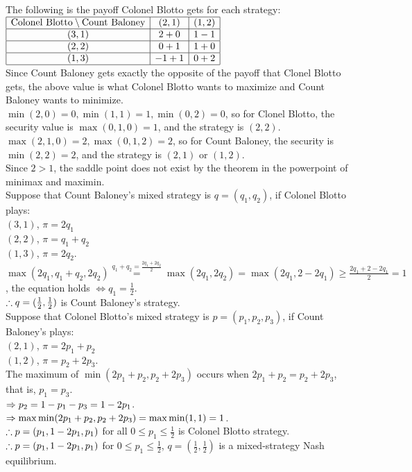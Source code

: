 \begin{pr}
The following is the payoff Colonel Blotto gets for each strategy:\\
$\begin{array}{|c|c|c|}\hline
\text{Colonel Blotto}\setminus\text{Count Baloney}&(2, 1)&(1, 2)\\\hline
(3, 1)&2+0&1-1\\\hline
(2, 2)&0+1&1+0\\\hline
(1, 3)&-1+1&0+2\\\hline
\end{array}$\\
Since Count Baloney gets exactly the opposite of the payoff that Clonel Blotto gets, the above value is what Colonel Blotto wants to maximize and Count Baloney wants to minimize.\\
$\min(2, 0)=0, \min(1, 1)=1, \min(0, 2)=0$, so for Clonel Blotto, the security value is $\max(0, 1, 0)=1$, and the strategy is $(2, 2)$.\\
$\max(2, 1, 0)=2, \max(0, 1, 2)=2$, so for Count Baloney, the security is $\min(2, 2)=2$, and the strategy is $(2, 1)$ or $(1, 2)$.\\
Since $2>1$, the saddle point does not exist by the theorem in the powerpoint of minimax and maximin.\\
Suppose that Count Baloney's mixed strategy is $q=(q_1, q_2)$, if Colonel Blotto plays:\\
$(3, 1)$, $\pi=2q_1$\\
$(2, 2)$, $\pi=q_1+q_2$\\
$(1, 3)$, $\pi=2q_2$.\\
$\max(2q_1, q_1+q_2, 2q_2)\overset{q_1+q_2=\frac{2q_1+2q_2}2}=\max(2q_1, 2q_2)=\max(2q_1, 2-2q_1)\geq\frac{2q_1+2-2q_1}2=1$, the equation holds $\iff q_1=\frac12$.\\
$\therefore q=(\frac12, \frac12)$ is Count Baloney's strategy.\\
Suppose that Colonel Blotto's mixed strategy is $p=(p_1, p_2, p_3)$, if Count Baloney's plays:\\
$(2, 1)$, $\pi=2p_1+p_2$\\
$(1, 2)$, $\pi=p_2+2p_3$.\\
The maximum of $\min(2p_1+p_2, p_2+2p_3)$ occurs when $2p_1+p_2=p_2+2p_3$, that is, $p_1=p_3$.\\
$\Rightarrow p_2=1-p_1-p_3=1-2p_1$.\\
$\Rightarrow\max\min(2p_1+p_2, p_2+2p_3)=\max\min(1, 1)=1$.\\
$\therefore p=(p_1, 1-2p_1, p_1)$ for all $0\leq p_1\leq\frac12$ is Colonel Blotto strategy.\\
$\therefore p=(p_1, 1-2p_1, p_1)$ for $0\leq p_1\leq\frac12$, $q=(\frac12, \frac12)$ is a mixed-strategy Nash equilibrium.
\end{pr}
\newpage
